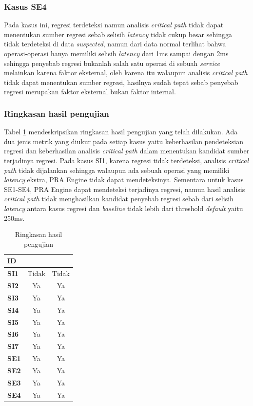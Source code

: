 \subsubsection{Kasus SE4}
Pada kasus ini, regresi terdeteksi namun analisis \textit{critical path} tidak dapat menentukan sumber regresi sebab selisih \textit{latency} tidak cukup besar sehingga tidak terdeteksi di data \textit{suspected}, namun dari data normal terlihat bahwa operasi-operasi hanya memiliki selisih \textit{latency} dari 1ms sampai dengan 2ms sehingga penyebab regresi bukanlah salah satu operasi di sebuah \textit{service} melainkan karena faktor eksternal, oleh karena itu walaupun analisis \textit{critical path} tidak dapat menentukan sumber regresi, hasilnya sudah tepat sebab penyebab regresi merupakan faktor eksternal bukan faktor internal.

\subsubsection{Ringkasan hasil pengujian}
Tabel \ref{test-summary} mendeskripsikan ringkasan hasil pengujian yang telah dilakukan. Ada dua jenis metrik yang diukur pada setiap kasus yaitu keberhasilan pendeteksian regresi dan keberhasilan analisis \textit{critical path} dalam menentukan kandidat sumber terjadinya regresi. Pada kasus SI1, karena regresi tidak terdeteksi, analisis \textit{critical path} tidak dijalankan sehingga walaupun ada sebuah operasi yang memiliki \textit{latency} ekstra, PRA Engine tidak dapat mendeteksinya. Sementara untuk kasus SE1-SE4, PRA Engine dapat mendeteksi terjadinya regresi, namun hasil analisis \textit{critical path} tidak menghasilkan kandidat penyebab regresi sebab dari selisih \textit{latency} antara kasus regresi dan \textit{baseline} tidak lebih dari threshold \textit{default} yaitu 250ms.
\begin{table}[htb]
	\caption{Ringkasan hasil pengujian}
	\centering
	\begin{tabular}{|l|c|c|}
		\hline
		\rowcolor[HTML]{3166FF} 
		{\color[HTML]{FFFFFF} ID} &
		\multicolumn{1}{l|}{\cellcolor[HTML]{3166FF}{\color[HTML]{FFFFFF} Regresi terdeteksi}} &
		\multicolumn{1}{l|}{\cellcolor[HTML]{3166FF}{\color[HTML]{FFFFFF} Hasil Critical Path sesuai}} \\ \hline
		\textbf{SI1} & Tidak & Tidak \\ \hline
		\textbf{SI2} & Ya    & Ya    \\ \hline
		\textbf{SI3} & Ya    & Ya    \\ \hline
		\textbf{SI4} & Ya    & Ya    \\ \hline
		\textbf{SI5} & Ya    & Ya    \\ \hline
		\textbf{SI6} & Ya    & Ya    \\ \hline
		\textbf{SI7} & Ya    & Ya    \\ \hline
		\textbf{SE1} & Ya    & Ya \\ \hline
		\textbf{SE2} & Ya    & Ya \\ \hline
		\textbf{SE3} & Ya    & Ya \\ \hline
		\textbf{SE4} & Ya    & Ya \\ \hline
	\end{tabular}
	\label{test-summary}
\end{table}

